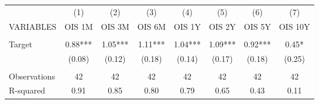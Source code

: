 \begin{tabular}{lccccccc} \hline
 & (1) & (2) & (3) & (4) & (5) & (6) & (7) \\
VARIABLES & OIS 1M & OIS 3M & OIS 6M & OIS 1Y & OIS 2Y & OIS 5Y & OIS 10Y \\ \hline
 &  &  &  &  &  &  &  \\
Target & 0.88*** & 1.05*** & 1.11*** & 1.04*** & 1.09*** & 0.92*** & 0.45* \\
 & (0.08) & (0.12) & (0.18) & (0.14) & (0.17) & (0.18) & (0.25) \\
 &  &  &  &  &  &  &  \\
Observations & 42 & 42 & 42 & 42 & 42 & 42 & 42 \\
 R-squared & 0.91 & 0.85 & 0.80 & 0.79 & 0.65 & 0.43 & 0.11 \\ \hline
\end{tabular}
